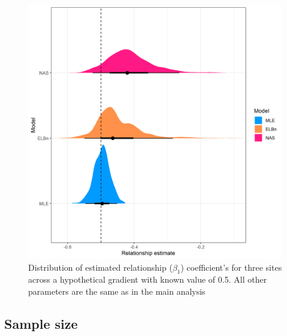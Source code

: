 \documentclass[
]{article}
\begin{document}
\newpage

\begin{figure}
\centering
\includegraphics{figures/PLB_3_sites_relationship_density.png}
\caption{Distribution of estimated relationship (\(\beta_1\))
coefficient's for three sites across a hypothetical gradient with known
value of 0.5. All other parameters are the same as in the main analysis}
\end{figure}

\newpage

\hypertarget{sample-size}{%
\subsection{Sample size}\label{sample-size}}
\end{document}
